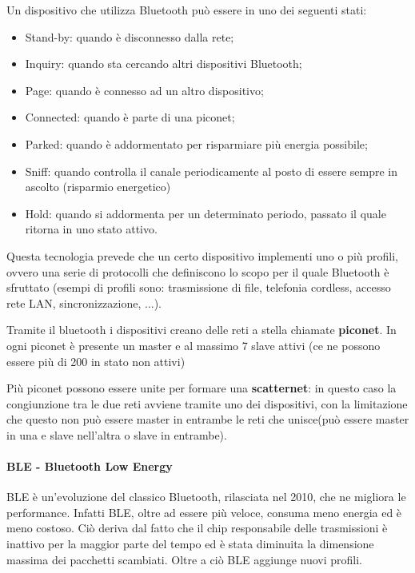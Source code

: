 Un dispositivo che utilizza Bluetooth può essere in uno dei seguenti stati:
\begin{itemize}
  \item Stand-by: quando è disconnesso dalla rete;
  \item Inquiry: quando sta cercando altri dispositivi Bluetooth;
  \item Page: quando è connesso ad un altro dispositivo;
  \item Connected: quando è parte di una piconet;
  \item Parked: quando è addormentato per risparmiare più energia possibile;
  \item Sniff: quando controlla il canale periodicamente al posto di essere 
        sempre in ascolto (risparmio energetico)
  \item Hold: quando si addormenta per un determinato periodo, passato il quale 
        ritorna in uno stato attivo.
\end{itemize}

Questa tecnologia prevede che un certo dispositivo implementi uno o più profili, 
ovvero una serie di protocolli che definiscono lo scopo per il quale Bluetooth è 
sfruttato (esempi di profili sono: trasmissione di file, telefonia cordless, 
accesso rete LAN, sincronizzazione, ...).

Tramite il bluetooth i dispositivi creano delle reti a stella chiamate 
\textbf{piconet}. In ogni piconet è presente un master e al massimo 7 slave 
attivi (ce ne possono essere più di 200 in stato non attivi)

Più piconet possono essere unite per formare una \textbf{scatternet}: in questo 
caso la congiunzione tra le due reti avviene tramite uno dei dispositivi, con la 
limitazione che questo non può essere master in entrambe le reti che unisce(può 
essere master in una e slave nell'altra o slave in entrambe).

\paragraph{BLE - Bluetooth Low Energy}
BLE è un'evoluzione del classico Bluetooth, rilasciata nel 2010, che ne migliora 
le performance. Infatti BLE, oltre ad essere più veloce, consuma meno energia ed 
è meno costoso. Ciò deriva dal fatto che il chip responsabile delle trasmissioni 
è inattivo per la maggior parte del tempo ed è stata diminuita la dimensione 
massima dei pacchetti scambiati. Oltre a ciò BLE aggiunge nuovi profili.


